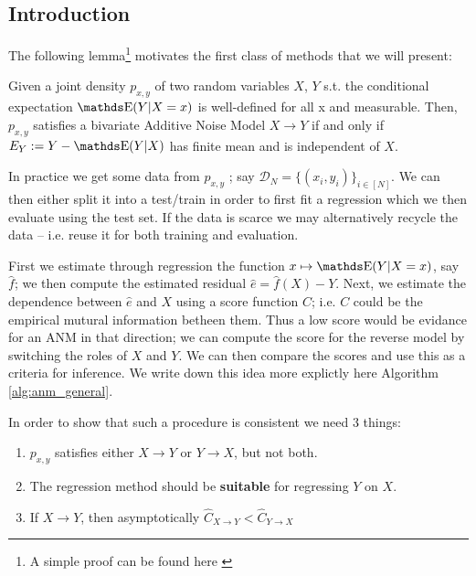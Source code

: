 \subsection{Introduction}

The following lemma\footnote{A simple proof can be found here \cite{Mooij2016jmlr}} motivates the 
first class of methods that we will present:

\begin{lemma}
    Given a joint density $p_{x, y}$ of two random variables $X$, $Y$ s.t. the conditional expectation
    $\E(Y |X = x)$ is well-defined for all x and measurable. Then, $p_{x, y}$ satisfies a bivariate 
    Additive Noise Model $X \rightarrow Y$ if and only if $E_Y := Y - \E(Y|X)$ has 
    finite mean and is independent of $X$.
\end{lemma}

In practice we get some data from $p_{x, y}$ ; say 
$\mathcal{D}_N = \{ (x_i, y_i )\}_{i \in [N]}$. We can then either split it into a test/train in order to 
first fit a regression which we then evaluate using the test set. If the data is scarce we may alternatively 
recycle the data -- i.e. reuse it for both training and evaluation.

First we estimate through regression the function $x \mapsto \E(Y | X=x)$, say $\hat{f}$; we 
then compute the estimated residual $\hat{e} = \hat{f}(X) - Y$. 
Next, we estimate the dependence between $\hat{e}$ and $X$ using a score function $C$; i.e. $C$ could be 
the empirical mutural information betheen them. Thus a low score would be evidance for an ANM in that direction; 
we can compute the score for the reverse model by switching the roles of $X$ and $Y$. We can then compare 
the scores and use this as a criteria for inference. We write down this idea more explictly 
here Algorithm \ref{alg:anm_general}.

In order to show that such a procedure is consistent we need 3 things:

\begin{enumerate}
    \item $p_{x, y}$ satisfies either $X \rightarrow Y$ or $Y \rightarrow X$, but not both.
    \item The regression method should be \textbf{suitable} for regressing $Y$ on $X$.
    \item If $X \rightarrow Y$, then asymptotically $\hat{C}_{X \rightarrow Y} < \hat{C}_{Y \rightarrow X}$
\end{enumerate}


